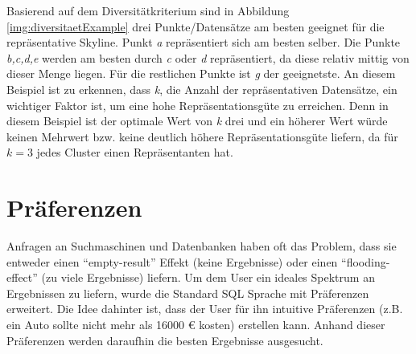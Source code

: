 {Basierend auf dem Diversitätkriterium sind in Abbildung \ref{img:diversitaetExample} drei Punkte/Datensätze am besten geeignet für die repräsentative Skyline. Punkt \textit{a} repräsentiert sich am besten selber. Die Punkte \textit{b,c,d,e} werden am besten durch \textit{c} oder \textit{d} repräsentiert, da diese relativ mittig von dieser Menge liegen. Für die restlichen Punkte ist \textit{g} der geeignetste.
An diesem Beispiel ist zu erkennen, dass \textit{k}, die Anzahl der repräsentativen Datensätze, ein wichtiger Faktor ist, um eine hohe Repräsentationsgüte zu erreichen. Denn in diesem Beispiel ist der optimale Wert von \textit{k} drei und ein höherer Wert würde keinen Mehrwert bzw. keine deutlich höhere Repräsentationsgüte liefern, da für $k=3$ jedes Cluster einen Repräsentanten hat.
\section{Präferenzen}
\label{ch:Grundlagen:sec:präferenzen}
Anfragen an Suchmaschinen und Datenbanken haben oft das Problem, dass sie entweder einen \enquote{empty-result} Effekt (keine Ergebnisse) oder einen \enquote{flooding-effect} (zu viele Ergebnisse) liefern. Um dem User ein ideales Spektrum an Ergebnissen zu liefern, wurde die Standard SQL Sprache mit Präferenzen erweitert. Die Idee dahinter ist, dass der User für ihn intuitive Präferenzen (z.B. ein Auto sollte nicht mehr als 16000 \euro{} kosten) erstellen kann. Anhand dieser Präferenzen werden daraufhin die besten Ergebnisse ausgesucht.

\begin{figure}[H]
\centering
{}
\end{figure}}
